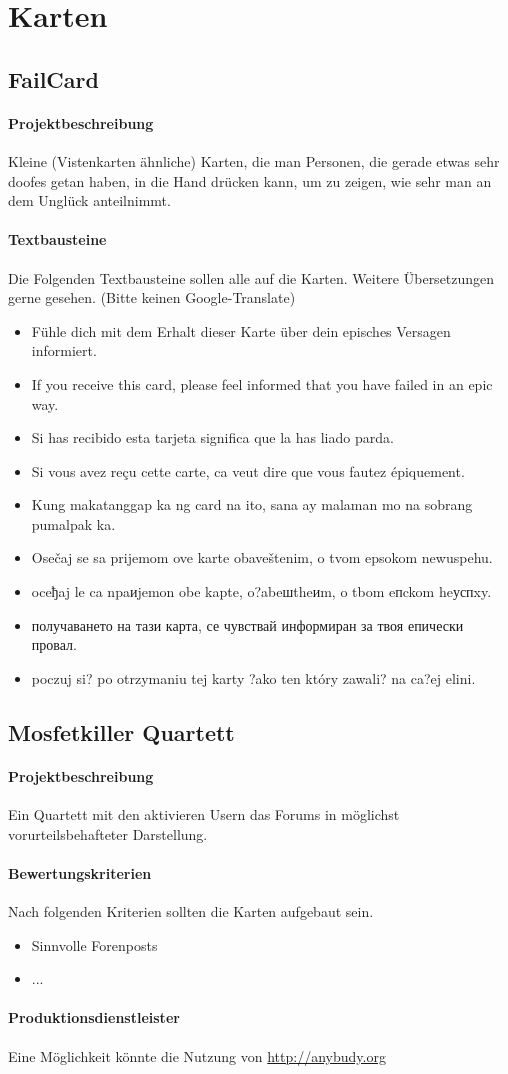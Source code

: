 \section{Karten}
\subsection{FailCard}
\paragraph{Projektbeschreibung} Kleine (Vistenkarten ähnliche) Karten, die man Personen, die gerade etwas sehr doofes getan haben, in die Hand drücken kann, um zu zeigen, wie sehr man an dem Unglück anteilnimmt.
\paragraph{Textbausteine}
Die Folgenden Textbausteine sollen alle auf die Karten. Weitere Übersetzungen gerne gesehen. (Bitte keinen Google-Translate)
\begin{itemize}
	\item Fühle dich mit dem Erhalt dieser Karte über dein episches Versagen informiert.
	\item If you receive this card, please feel informed that you have failed in an epic way.
	\item Si has recibido esta tarjeta significa que la has liado parda.
	\item Si vous avez reçu cette carte, ca veut dire que vous fautez épiquement.
	\item Kung makatanggap ka ng card na ito, sana ay malaman mo na sobrang pumalpak ka.
	\item Osečaj se sa prijemom ove karte obaveštenim, o tvom epsokom newuspehu.
	\item \foreignlanguage{russian}{oceђaj le ca npaиjemon obe kapte, o?abeшtheиm, o tbom eпckom heуспxy.}
	\item \foreignlanguage{russian}{получаването на тази карта, се чувствай информиран за твоя епически провал.}
	\item \foreignlanguage{russian}{poczuj si? po otrzymaniu tej karty ?ako ten który zawali? na ca?ej elini.}
\end{itemize}

\subsection{Mosfetkiller Quartett}
\paragraph{Projektbeschreibung} Ein Quartett mit den aktivieren Usern das Forums in möglichst vorurteilsbehafteter Darstellung. 
\paragraph{Bewertungskriterien} Nach folgenden Kriterien sollten die Karten aufgebaut sein.
\begin{itemize}
	\item Sinnvolle Forenposts
	\item ...
\end{itemize}

\paragraph{Produktionsdienstleister} Eine Möglichkeit könnte die Nutzung von \url{http://anybudy.org}